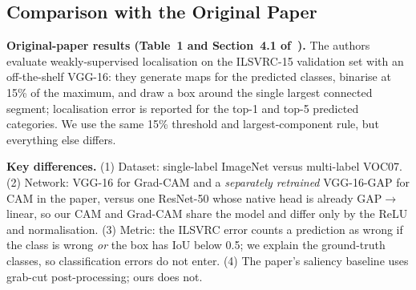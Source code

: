 \documentclass[11pt,a4paper]{article}
\newcommand{\GC}{Grad-CAM}
\begin{document}
\subsection{Comparison with the Original Paper}
\textbf{Original-paper results (Table~1 and Section~4.1 of~\citep{selvaraju2017}).} The authors evaluate weakly-supervised localisation on the ILSVRC-15 validation set with an off-the-shelf VGG-16: they generate maps for the predicted classes, binarise at 15\% of the maximum, and draw a box around the single largest connected segment; localisation error is reported for the top-1 and top-5 predicted categories. We use the same 15\% threshold and largest-component rule, but everything else differs.
\begin{table}[h]\centering\caption{Original-paper numbers versus ours. Left block: values \emph{copied from Table~1 of the paper} (localisation \emph{error} in \%, lower is better). Right block: \emph{our measurements} (localisation \emph{accuracy} in \%, higher is better). The two blocks use different datasets, networks and metrics and must not be compared numerically.}\small
{}\end{table}
\textbf{Key differences.} (1) Dataset: single-label ImageNet versus multi-label VOC07. (2) Network: VGG-16 for \GC{} and a \emph{separately retrained} VGG-16-GAP for CAM in the paper, versus one ResNet-50 whose native head is already GAP$\rightarrow$linear, so our CAM and \GC{} share the model and differ only by the ReLU and normalisation. (3) Metric: the ILSVRC error counts a prediction as wrong if the class is wrong \emph{or} the box has IoU below 0.5; we explain the ground-truth classes, so classification errors do not enter. (4) The paper's saliency baseline uses grab-cut post-processing; ours does not.
\end{document}
